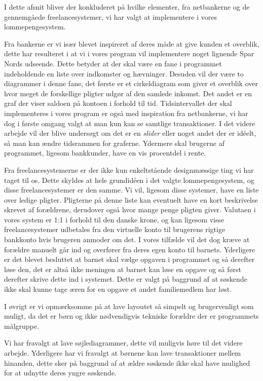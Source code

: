 I dette afsnit bliver der konkluderet på hvilke elementer, fra netbankerne og de gennemgåede freelancesystemer, vi har valgt at implementere i vores lommepengesystem.

Fra bankerne er vi især blevet inspireret af deres måde at give kunden et overblik, dette har resulteret i at vi i vores program vil implementere noget lignende Spar Nords udseende. Dette betyder at der skal være en fane i programmet indeholdende en liste over indkomster og hævninger. Desuden vil der være to diagrammer i denne fane, det første er et cirkeldiagram som giver et overblik over hvor meget de forskellige pligter udgør af den samlede inkomst. Det andet er en graf der viser saldoen på kontoen i forhold til tid. Tidsintervallet der skal implementeres i vores program er også med inspiration fra netbankerne, vi har dog i første omgang valgt at man kun kan se samtlige transaktioner. I det videre arbejde vil der blive undersøgt om det er en \textit{slider} eller noget andet der er idéelt, så man kan ændre tidsrammen for graferne. Ydermere skal brugerne af programmet, ligesom bankkunder, have en vis procentdel i rente.

Fra freelancesystemerne er der ikke kun enkeltstående designmæssige ting vi har taget til os. Dette skyldes at hele grundidéen i det  valgte lommepengesystem, og disse freelancesystemer er den samme. Vi  vil, ligesom disse systemer, have en liste over ledige pligter. Pligterne på denne liste kan eventuelt have en kort beskrivelse skrevet af forældrene, derudover også hvor mange penge pligten giver. Valutaen i vores system er 1:1 i forhold til den danske krone, og kan ligesom visse freelancesystemer udbetales fra den virtuelle konto til brugerens rigtige bankkonto hvis brugeren anmoder om det. I vores tilfælde vil det dog kræve at forældre manuelt går ind og overfører fra deres egen konto til barnets. Yderligere er det blevet besluttet at barnet skal vælge opgaven i programmet og så derefter løse den, det er altså ikke meningen at barnet kan løse en opgave og så først derefter skrive dette ind i systemet. Dette er valgt på baggrund af at søskende ikke skal kunne tage æren for en opgave et andet familiemedlem har løst.

I øvrigt er vi opmærksomme på at lave layoutet så simpelt og brugervenligt som muligt, da det er børn og ikke nødvendigvis tekniske forældre der er programmets målgruppe. 

Vi har fravalgt at lave søjlediagrammer, dette vil muligvis høre til det videre arbejde. Yderligere har vi fravalgt at børnene kan lave transaktioner mellem hinanden, dette sker på baggrund af at ældre søskende ikke skal have mulighed for at udnytte deres yngre søskende.




